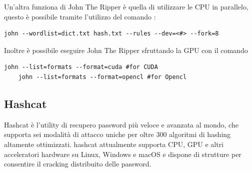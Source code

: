 Un'altra funziona di John The Ripper è quella di utilizzare le CPU in parallelo, questo è possibile tramite l'utilizzo del comando :

\begin{lstlisting}[caption={John the ripper Multi-CPU example 8 core}, style=javaScriptCode]
    john --wordlist=dict.txt hash.txt --rules --dev=<#> --fork=8
\end{lstlisting}

Inoltre è possibile eseguire John The Ripper sfruttando la GPU con il comando 
\begin{lstlisting}[caption={John the ripper GPU example}, style=javaScriptCode]
    john --list=formats --format=cuda #for CUDA
    john --list=formats --format=opencl #for Opencl\end{lstlisting}
\subsection{Hashcat}

Hashcat è l'utility di recupero password più veloce e avanzata al mondo, che supporta sei modalità di attacco uniche per oltre 300 algoritmi di hashing altamente ottimizzati. hashcat attualmente supporta CPU, GPU e altri acceleratori hardware su Linux, Windows e macOS e dispone di strutture per consentire il cracking distribuito delle password.

